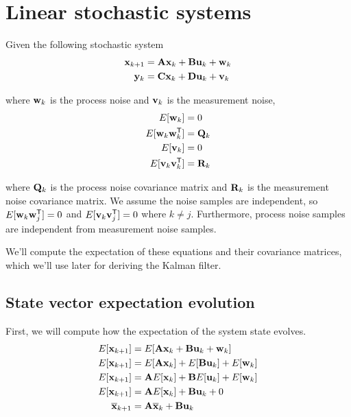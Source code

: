 \section{Linear stochastic systems}

Given the following stochastic system
\begin{align*}
  \mathbf{x}_{k+1} &= \mathbf{A}\mathbf{x}_k + \mathbf{B}\mathbf{u}_k + \mathbf{w}_k \\
  \mathbf{y}_k &= \mathbf{C}\mathbf{x}_k + \mathbf{D}\mathbf{u}_k + \mathbf{v}_k
\end{align*}

where $\mathbf{w}_k$ is the process noise and $\mathbf{v}_k$ is the measurement noise,
 
\begin{align*}
  E[\mathbf{w}_k] &= 0 \\
  E[\mathbf{w}_k\mathbf{w}_k^\mathsf{T}] &= \mathbf{Q}_k \\
  E[\mathbf{v}_k] &= 0 \\
  E[\mathbf{v}_k\mathbf{v}_k^\mathsf{T}] &= \mathbf{R}_k
\end{align*}

where $\mathbf{Q}_k$ is the process noise covariance matrix and $\mathbf{R}_k$ is the
measurement noise covariance matrix. We assume the noise samples are
independent, so $E[\mathbf{w}_k\mathbf{w}_j^\mathsf{T}] = 0$ and $E[\mathbf{v}_k\mathbf{v}_j^\mathsf{T}] = 0$
where $k \neq j$. Furthermore, process noise samples are independent from
measurement noise samples.

We'll compute the expectation of these equations and their covariance matrices,
which we'll use later for deriving the Kalman filter.

\subsection{State vector expectation evolution}

First, we will compute how the expectation of the \gls{system} \gls{state}
evolves.
\begin{align*}
  E[\mathbf{x}_{k+1}] &= E[\mathbf{A}\mathbf{x}_k + \mathbf{B}\mathbf{u}_k + \mathbf{w}_k] \\
  E[\mathbf{x}_{k+1}] &= E[\mathbf{A}\mathbf{x}_k] + E[\mathbf{B}\mathbf{u}_k] +
    E[\mathbf{w}_k] \\
  E[\mathbf{x}_{k+1}] &= \mathbf{A}E[\mathbf{x}_k] + \mathbf{B}E[\mathbf{u}_k] +
    E[\mathbf{w}_k] \\
  E[\mathbf{x}_{k+1}] &= \mathbf{A}E[\mathbf{x}_k] + \mathbf{B}\mathbf{u}_k + 0 \\
  \overline{\mathbf{x}}_{k+1} &= \mathbf{A}\overline{\mathbf{x}}_k + \mathbf{B}\mathbf{u}_k \\
\end{align*}

